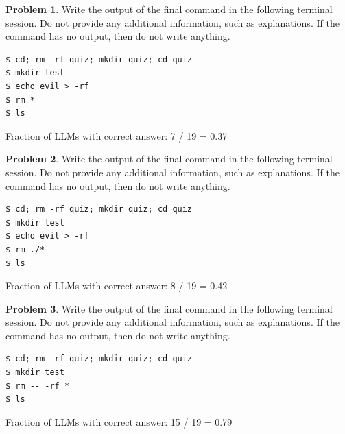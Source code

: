 \documentclass[10pt]{article}
\theoremstyle{definition}
\newtheorem{problem}{Problem}
\begin{document}
\noindent\vspace{0.1in}\begin{minipage}{\textwidth}

\begin{problem}
Write the output of the final command in the following terminal session.
Do not provide any additional information,
such as explanations.
If the command has no output,
then do not write anything.

\end{problem}
\begin{lstlisting}
$ cd; rm -rf quiz; mkdir quiz; cd quiz
$ mkdir test
$ echo evil > -rf
$ rm *
$ ls
\end{lstlisting}

Fraction of LLMs with correct answer: 7 / 19 = 0.37
\end{minipage}
\noindent\vspace{0.1in}\begin{minipage}{\textwidth}

\begin{problem}
Write the output of the final command in the following terminal session.
Do not provide any additional information,
such as explanations.
If the command has no output,
then do not write anything.

\end{problem}
\begin{lstlisting}
$ cd; rm -rf quiz; mkdir quiz; cd quiz
$ mkdir test
$ echo evil > -rf
$ rm ./*
$ ls
\end{lstlisting}

Fraction of LLMs with correct answer: 8 / 19 = 0.42
\end{minipage}
\noindent\vspace{0.1in}\begin{minipage}{\textwidth}

\begin{problem}
Write the output of the final command in the following terminal session.
Do not provide any additional information,
such as explanations.
If the command has no output,
then do not write anything.

\end{problem}
\begin{lstlisting}
$ cd; rm -rf quiz; mkdir quiz; cd quiz
$ mkdir test
$ rm -- -rf *
$ ls
\end{lstlisting}

Fraction of LLMs with correct answer: 15 / 19 = 0.79
\end{minipage}
\end{document}
